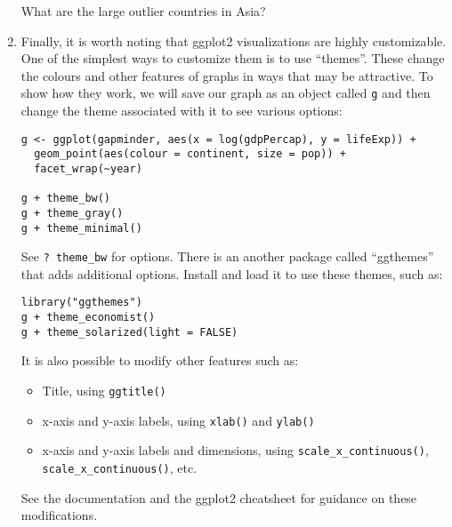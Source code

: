 \documentclass[a4paper,12pt]{article}
\begin{document}
\begin{enumerate}
What are the large outlier countries in Asia?

\item Finally, it is worth noting that ggplot2 visualizations are highly customizable. One of the simplest ways to customize them is to use ``themes''. These change the colours and other features of graphs in ways that may be attractive. To show how they work, we will save our graph as an object called \texttt{g} and then change the theme associated with it to see various options:

\begin{verbatim}
g <- ggplot(gapminder, aes(x = log(gdpPercap), y = lifeExp)) + 
  geom_point(aes(colour = continent, size = pop)) + 
  facet_wrap(~year)

g + theme_bw()
g + theme_gray()
g + theme_minimal()
\end{verbatim}

See \texttt{? theme\_bw} for options. There is an another package called ``ggthemes'' that adds additional options. Install and load it to use these themes, such as:

\begin{verbatim}
library("ggthemes")
g + theme_economist()
g + theme_solarized(light = FALSE)
\end{verbatim}

It is also possible to modify other features such as:

\begin{itemize}
\item Title, using \texttt{ggtitle()}
\item x-axis and y-axis labels, using \texttt{xlab()} and \texttt{ylab()}
\item x-axis and y-axis labels and dimensions, using \texttt{scale\_x\_continuous()}, \texttt{scale\_x\_continuous()}, etc.
\end{itemize}

See the documentation and the ggplot2 cheatsheet for guidance on these modifications.

\end{enumerate}
\end{document}
